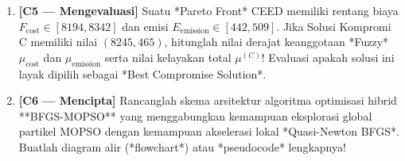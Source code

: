 \documentclass[11pt,a4paper]{article}
\begin{document}
\begin{enumerate}[label=\textbf{Soal \arabic*:}, leftmargin=*, resume]
    \item \textbf{[C5 --- Mengevaluasi]} Suatu *Pareto Front* CEED memiliki rentang biaya $F_{\text{cost}} \in [8194, 8342]$ dan emisi $E_{\text{emission}} \in [442, 509]$. Jika Solusi Kompromi C memiliki nilai $(8245, 465)$, hitunglah nilai derajat keanggotaan *Fuzzy* $\mu_{\text{cost}}$ dan $\mu_{\text{emission}}$ serta nilai kelayakan total $\mu^{(C)}$! Evaluasi apakah solusi ini layak dipilih sebagai *Best Compromise Solution*.
    
    \begin{tcolorbox}[colback=white,colframe=gray!50,height=4.5cm,title=Ruang Jawaban Soal 5]
    \end{tcolorbox}

    \item \textbf{[C6 --- Mencipta]} Rancanglah skema arsitektur algoritma optimisasi hibrid **BFGS-MOPSO** yang menggabungkan kemampuan eksplorasi global partikel MOPSO dengan kemampuan akselerasi lokal *Quasi-Newton BFGS*. Buatlah diagram alir (*flowchart*) atau *pseudocode* lengkapnya!
    
    \begin{tcolorbox}[colback=white,colframe=gray!50,height=6.5cm,title=Ruang Jawaban Soal 6]
    \end{tcolorbox}
\end{enumerate}
\end{document}
